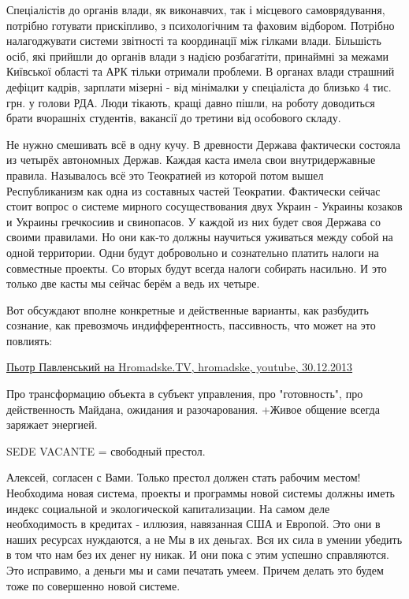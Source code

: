 \begin{itemize}
Спеціалістів до органів влади, як виконавчих, так і місцевого самоврядування,
потрібно готувати прискіпливо, з психологічним та фаховим відбором. Потрібно
налагоджувати системи звітності та координації між гілками влади. Більшість
осіб, які прийшли до органів влади з надією розбагатіти, принаймні за межами
Київської області та АРК тільки отримали проблеми. В органах влади страшний
дефіцит кадрів, зарплати мізерні - від мінімалки у спеціаліста до близько 4
тис. грн. у голови РДА. Люди тікають, кращі давно пішли, на роботу доводиться
брати вчорашніх студентів, вакансії до третини від особового складу.


Не нужно смешивать всё в одну кучу. В древности Держава фактически состояла из
четырёх автономных Держав. Каждая каста имела свои внутридержавные правила.
Называлось всё это Теократией из которой потом вышел Республиканизм как одна из
составных частей Теократии. Фактически сейчас стоит вопрос о системе мирного
сосуществования двух Украин - Украины козаков и Украины гречкосиив и
свинопасов. У каждой из них будет своя Держава со своими правилами. Но они
как-то должны научиться уживаться между собой на одной территории. Одни будут
добровольно и сознательно платить налоги на совместные проекты. Со вторых будут
всегда налоги собирать насильно. И это только две касты мы сейчас берём а ведь
их четыре.


Вот обсуждают вполне конкретные и действенные варианты, как разбудить сознание,
как превозмочь индифферентность, пассивность, что может на это повлиять:

\href{http://www.youtube.com/watch?v=MfZI-Pd7Cg8}{%
Пьотр Павленський на Hromadske.TV, hromadske, youtube, 30.12.2013%
}

Про трансформацию объекта в субъект управления, про "готовность", про
действенность Майдана, ожидания и разочарования. +Живое общение всегда заряжает
энергией.

SEDE VACANTE = свободный престол.


Алексей, согласен с Вами. Только престол должен стать рабочим местом! Необходима
новая система, проекты и программы новой системы должны иметь индекс социальной
и экологической капитализации. На самом деле необходимость в кредитах -
иллюзия, навязанная США и Европой. Это они в наших ресурсах нуждаются, а не Мы
в их деньгах. Вся их сила в умении убедить в том что нам без их денег ну никак.
И они пока с этим успешно справляются. Это исправимо, а деньги мы и сами
печатать умеем. Причем делать это будем тоже по совершенно новой системе.



\end{itemize}
